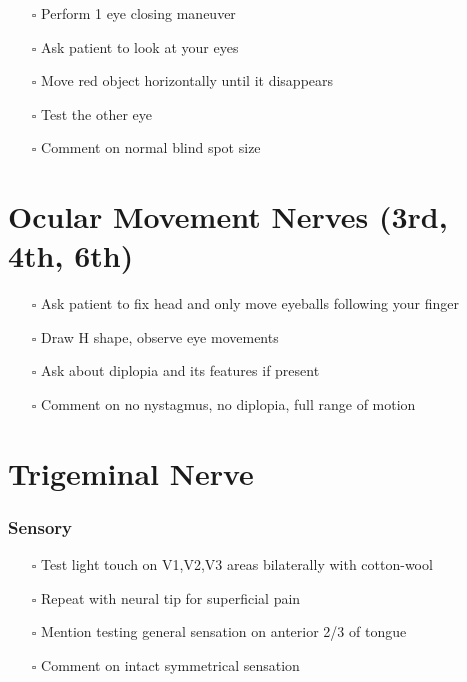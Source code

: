 \documentclass[
  13.5pt,
  a4paper,
  DIV=11,
  numbers=noendperiod]{scrreprt}
\providecommand{\tightlist}{%
  \setlength{\itemsep}{0pt}\setlength{\parskip}{0pt}}
\begin{document}
\begin{itemize}
\tightlist
\item[$\square$]
  Perform 1 eye closing maneuver
\item[$\square$]
  Ask patient to look at your eyes
\item[$\square$]
  Move red object horizontally until it disappears
\item[$\square$]
  Test the other eye
\item[$\square$]
  Comment on normal blind spot size
\end{itemize}

\section{Ocular Movement Nerves (3rd, 4th,
6th)}\label{ocular-movement-nerves-3rd-4th-6th}

\begin{itemize}
\tightlist
\item[$\square$]
  Ask patient to fix head and only move eyeballs following your finger
\item[$\square$]
  Draw H shape, observe eye movements
\item[$\square$]
  Ask about diplopia and its features if present
\item[$\square$]
  Comment on no nystagmus, no diplopia, full range of motion
\end{itemize}

\section{Trigeminal Nerve}\label{trigeminal-nerve}

\subsubsection{Sensory}\label{sensory}

\begin{itemize}
\tightlist
\item[$\square$]
  Test light touch on V1,V2,V3 areas bilaterally with cotton-wool
\item[$\square$]
  Repeat with neural tip for superficial pain
\item[$\square$]
  Mention testing general sensation on anterior 2/3 of tongue
\item[$\square$]
  Comment on intact symmetrical sensation
\end{itemize}
\end{document}
